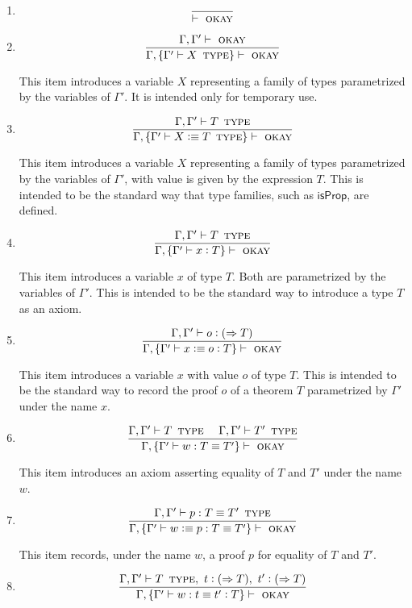 \documentclass[11pt]{article}
\newcommand{\eqd}{\equiv}
\newcommand{\spc}{{\,\,\,\,\,\,\,}}
\newcommand{\ccolon}[1]{\vcentcolon#1}
\newcommand{\synth}[1]{\vcentcolon(\Rightarrow#1)} %
\newcommand{\Type}{\mathop{\text{ \sc type}}}
\newcommand{\Okay}{\mathop{\text{ \sc okay}}}
\newcommand{\defn}{\vcentcolon\equiv}
\begin{document}
\begin{enumerate}

\item
$$\frac{}{\vdash\Okay}$$

\item
$$\frac{\Gamma,\Gamma'\vdash \Okay}{\Gamma,\{\Gamma' \vdash X \Type \} \vdash\Okay}$$

This item introduces a variable $X$ representing a family of types parametrized by
the variables of $\Gamma'$.  It is intended only for temporary use.

\item
$$\frac{\Gamma,\Gamma'\vdash T \Type }{\Gamma,\{\Gamma' \vdash X \defn T \Type \} \vdash\Okay}$$

This item introduces a variable $X$ representing a family of types parametrized by
the variables of $\Gamma'$, with value is given by the expression $T$.  This is
intended to be the standard way that type families, such as $\mathsf{isProp}$,
are defined.

\item
$$\frac{\Gamma,\Gamma'\vdash T \Type}{\Gamma,\{\Gamma' \vdash x \ccolon{T} \} \vdash\Okay}$$

This item introduces a variable $x$ of type $T$.  Both are parametrized by the
variables of $\Gamma'$.  This is intended to be the standard way to introduce a
type $T$ as an axiom.

\item
$$\frac{\Gamma,\Gamma'\vdash o \synth T}{\Gamma,\{\Gamma' \vdash x \defn o \ccolon{T} \} \vdash\Okay}$$

This item introduces a variable $x$ with value $o$ of type $T$. This is
intended to be the standard way to record the proof $o$ of a theorem $T$
parametrized by $\Gamma'$ under the name $x$.

\item
$$\frac{\Gamma,\Gamma'\vdash T \Type \spc \Gamma,\Gamma'\vdash T' \Type}{\Gamma,\{\Gamma' \vdash w : T \eqd T' \} \vdash\Okay}$$

This item introduces an axiom asserting equality of $T$ and $T'$ under the name $w$.

\item
$$\frac{\Gamma,\Gamma'\vdash p : T \eqd T' \Type}{\Gamma,\{\Gamma' \vdash w \defn p : T \eqd T' \} \vdash\Okay}$$

This item records, under the name $w$, a proof $p$ for equality of $T$ and $T'$.

\item
$$\frac{\Gamma,\Gamma'\vdash T \Type,~ t \synth{T},~ t' \synth{T}}{\Gamma,\{\Gamma' \vdash w : t \eqd t' \ccolon{T} \} \vdash\Okay}$$


\end{enumerate}
\end{document}
